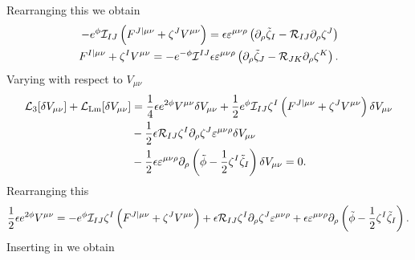 Rearranging this we obtain
\begin{equation}
\label{eq:fandv}
\begin{aligned}
		- e^{\phi} {\cal I}_{IJ} \left(F^{J |\mu \nu} + \zeta^J V^{\mu \nu}\right) = \epsilon \varepsilon^{\mu\nu\rho} \left( \partial_\rho \tilde{\zeta}_I - {\cal R}_{IJ} \partial_\rho \zeta^J \right) \\
			F^{I |\mu \nu} + \zeta^I V^{\mu \nu} = - e^{-\phi} {\cal I}^{IJ} \epsilon \varepsilon^{\mu\nu\rho} \left( \partial_\rho \tilde{\zeta}_J - {\cal R}_{JK} \partial_\rho \zeta^K \right) .
\end{aligned}
\end{equation}
Varying with respect to $V_{\mu \nu}$
\begin{equation*}
	\begin{aligned}
		{\cal L}_3[\delta V_{\mu \nu}] + {\cal L}_{\text{Lm}}[\delta V_{\mu \nu}] &= \frac{1}{4} \epsilon e^{2\phi} V^{\mu \nu} \delta V_{\mu \nu} 
		+ \frac{1}{2} e^{\phi} {\cal I}_{IJ} \zeta^I \left(F^{J |\mu \nu} + \zeta^J V^{\mu \nu} \right) \delta V_{\mu \nu} \\
		&- \frac{1}{2} \epsilon {\cal R}_{IJ} \zeta^I \partial_\rho \zeta^J \varepsilon^{\mu\nu\rho} \delta V_{\mu \nu} \\
		&- \frac{1}{2} \epsilon \varepsilon^{\mu\nu\rho} \partial_\rho \left(\tilde{\phi} - \frac{1}{2} \zeta^I \tilde{\zeta}_I \right) \delta V_{\mu \nu} = 0.
	\end{aligned}
\end{equation*}
Rearranging this
\begin{equation*}
	\begin{aligned}
		\frac{1}{2} \epsilon e^{2 \phi} V^{\mu \nu} = - e^{\phi} {\cal I}_{IJ} \zeta^I \left(F^{J |\mu \nu} + \zeta^J V^{\mu \nu} \right) + \epsilon {\cal R}_{IJ} \zeta^I \partial_\rho \zeta^J \varepsilon^{\mu\nu\rho} + \epsilon \varepsilon^{\mu\nu\rho} \partial_\rho \left(\tilde{\phi} - \frac{1}{2} \zeta^I \tilde{\zeta}_I \right).
	\end{aligned}
\end{equation*}
Inserting in  we obtain
